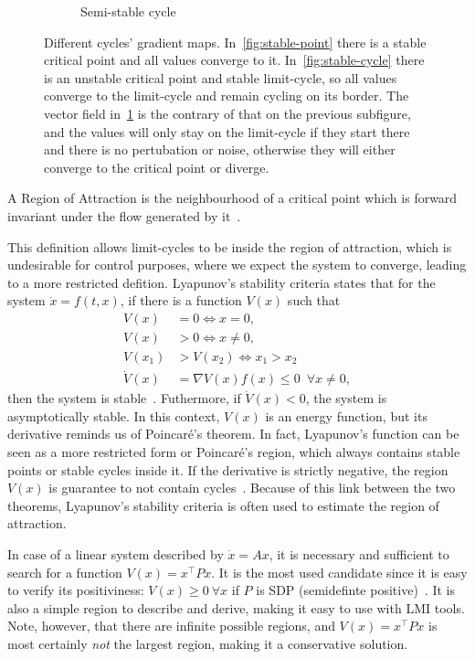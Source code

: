 \begin{figure}[!htb]
\begin{subfigure}[b]{0.5\linewidth}
    \caption{Semi-stable cycle}%
    \label{fig:semi-stable-cycle}
  \end{subfigure}
  \caption[Different cycles' gradient maps.]{Different cycles' gradient maps.
    In~\ref{fig:stable-point} there is a stable critical point and all values
    converge to it. In~\ref{fig:stable-cycle} there is an unstable critical
    point and stable limit-cycle, so all values converge to the limit-cycle and
    remain cycling on its border. The vector field
    in~\ref{fig:semi-stable-cycle} is the contrary of that on the previous
    subfigure, and the values will only stay on the limit-cycle if they start
    there and there is no pertubation or noise, otherwise they will either
    converge to the critical point or diverge.}%
  \label{fig:poincare-cycles}
\end{figure}

\begin{definition}
  A Region of Attraction is the neighbourhood of a critical point which is
  forward invariant under the flow generated by it~\parencite[178]{milnor:on}.
\end{definition}

This definition allows limit-cycles to be inside the region of attraction, which
is undesirable for control purposes, where we expect the system to converge,
leading to a more restricted defition. Lyapunov's stability criteria states that
for the system \(\dot{x} = f(t, x)\), if there is a function \(V(x)\) such that
%
\begin{align}
  V(x)       & = 0 \iff x = 0,                                       \\
  V(x)       & > 0 \iff x \ne 0,                                     \\
  V(x_{1})   & >V(x_{2}) \iff x_{1} > x_{2}                          \\
  \dot{V}(x) & = \nabla{}V(x)f(x) \le 0 \phantom{0} \forall x \ne 0,
\end{align}
%
then the system is stable~\parencite{chen:linear,hespanha:linear}. Futhermore,
if \(\dot{V}(x)<0\), the system is asymptotically stable. In this context,
\(V(x)\) is an energy function, but its derivative reminds us of Poincaré's
theorem. In fact, Lyapunov's function can be seen as a more restricted form or
Poincaré's region, which always contains stable points or stable cycles inside
it. If the derivative is strictly negative, the region \(V(x)\) is guarantee to
not contain cycles~\parencite{chen:linear}. Because of this link between the two
theorems, Lyapunov's stability criteria is often used to estimate the region of
attraction.

In case of a linear system described by \(\dot{x} = Ax\), it is necessary and
sufficient to search for a function \(V(x)=x^{\top}Px\). It is the most used
candidate since it is easy to verify its positiviness: \(V(x)\ge{}0~\forall{}x\) if
\(P\) is SDP (semidefinte positive)~\parencite{bochnak.coste.ea:real}. It is
also a simple region to describe and derive, making it easy to use with LMI
tools. Note, however, that there are infinite possible regions, and
\(V(x)=x^{\top}Px\) is most certainly \textit{not} the largest region, making it a
conservative solution.
